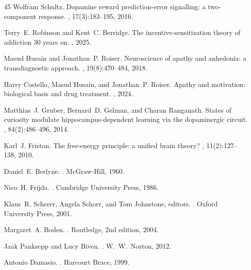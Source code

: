 \documentclass{article}
\begin{document}
\begin{thebibliography}{45}
Wolfram Schultz.
\newblock Dopamine reward prediction-error signalling: a two-component
  response.
, 17(3):183--195, 2016.

Terry~E. Robinson and Kent~C. Berridge.
\newblock The incentive-sensitization theory of addiction 30 years on.
, 2025.

Masud Husain and Jonathan~P. Roiser.
\newblock Neuroscience of apathy and anhedonia: a transdiagnostic approach.
, 19(8):470--484, 2018.

Harry Costello, Masud Husain, and Jonathan~P. Roiser.
\newblock Apathy and motivation: biological basis and drug treatment.
, 2024.

Matthias~J. Gruber, Bernard~D. Gelman, and Charan Ranganath.
\newblock States of curiosity modulate hippocampus-dependent learning via
  the dopaminergic circuit.
, 84(2):486--496, 2014.

Karl~J. Friston.
\newblock The free-energy principle: a unified brain theory?
, 11(2):127--138, 2010.

Daniel~E. Berlyne.
.
\newblock McGraw-Hill, 1960.

Nico~H. Frijda.
.
\newblock Cambridge University Press, 1986.

Klaus~R. Scherer, Angela Schorr, and Tom Johnstone, editors.
.
\newblock Oxford University Press, 2001.

Margaret~A. Boden.
.
\newblock Routledge, 2nd edition, 2004.

Jaak Panksepp and Lucy Biven.
.
\newblock W.~W.~Norton, 2012.

Antonio Damasio.
.
\newblock Harcourt Brace, 1999.


\end{thebibliography}
\end{document}
